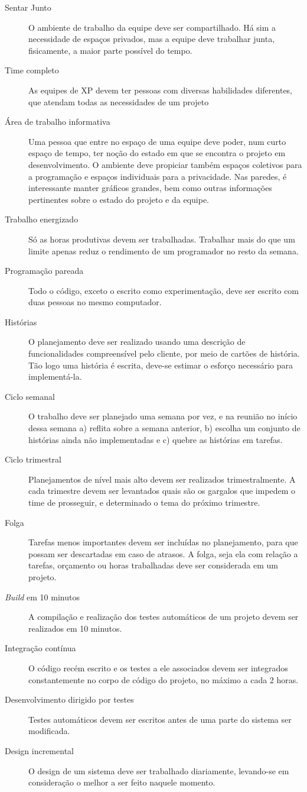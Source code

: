 \documentclass[a4paper,12pt,font=plain,header=plain]{abnt}
\begin{document}
	\begin{description}
		\item[Sentar Junto]
		O ambiente de trabalho da equipe deve ser compartilhado. Há sim a necessidade de espaços privados, mas a equipe deve trabalhar junta, fisicamente, a maior parte possível do tempo.
		\item[Time completo]
		As equipes de XP devem ter pessoas com diversas habilidades diferentes, que atendam todas as necessidades de um projeto
		\item[Área de trabalho informativa]
		Uma pessoa que entre no espaço de uma equipe deve poder, num curto espaço de tempo, ter noção do estado em que se encontra o projeto em desenvolvimento. O ambiente deve propiciar também espaços coletivos para a programação e espaços individuais para a privacidade. Nas paredes, é interessante manter gráficos grandes, bem como outras informações pertinentes sobre o estado do projeto e da equipe.
		\item[Trabalho energizado]
		Só as horas produtivas devem ser trabalhadas. Trabalhar mais do que um limite apenas reduz o rendimento de um programador no resto da semana.
		\item[Programação pareada]
		Todo o código, exceto o escrito como experimentação, deve ser escrito com duas pessoas no mesmo computador.
		\item[Histórias]
		O planejamento deve ser realizado usando uma descrição de funcionalidades compreensível pelo cliente, por meio de cartões de história. Tão logo uma história é escrita, deve-se estimar o esforço necessário para implementá-la.
		\item[Ciclo semanal]
		O trabalho deve ser planejado uma semana por vez, e na reunião no início dessa semana a) reflita sobre a semana anterior, b) escolha um conjunto de histórias ainda não implementadas e c) quebre as histórias em tarefas.
		\item[Ciclo trimestral]
		Planejamentos de nível mais alto devem ser realizados trimestralmente. A cada trimestre devem ser levantados quais são os gargalos que impedem o time de prosseguir, e determinado o tema do próximo trimestre.
		\item[Folga]
		Tarefas menos importantes devem ser incluídas no planejamento, para que possam ser descartadas em caso de atrasos. A folga, seja ela com relação a tarefas, orçamento ou horas trabalhadas deve ser considerada em um projeto.
		\item[\textit{Build} em 10 minutos]
		A compilação e realização dos testes automáticos de um projeto devem ser realizados em 10 minutos.
		\item[Integração contínua]
		O código recém escrito e os testes a ele associados devem ser integrados constantemente no corpo de código do projeto, no máximo a cada 2 horas.
		\item[Desenvolvimento dirigido por testes]
		Testes automáticos devem ser escritos antes de uma parte do sistema ser modificada.
		\item[Design incremental]
		O design de um sistema deve ser trabalhado diariamente, levando-se em consideração o melhor a ser feito naquele momento.
	\end{description}
	
\end{document}
